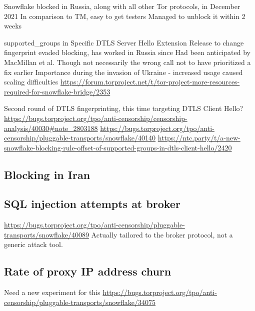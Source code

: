 \documentclass[letterpaper,twocolumn]{article}
\begin{document}
Snowflake blocked in Russia, along with all other Tor protocols,
in December 2021 \cite{ooni-2021-russia-blocks-tor}
In comparison to TM, easy to get testers
Managed to unblock it within 2 weeks

supported\_groups in Specific DTLS Server Hello Extension
Release to change fingerprint evaded blocking, has worked in Russia since
Had been anticipated by MacMillan et al.\cite[\S 3]{arxiv.2008.03254}
Though not necessarily the wrong call not to have prioritized a fix earlier
Importance during the invasion of Ukraine
- increased usage caused scaling difficulties
  \url{https://forum.torproject.net/t/tor-project-more-resources-required-for-snowflake-bridge/2353}

Second round of DTLS fingerprinting, this time targeting DTLS Client Hello?
\url{https://bugs.torproject.org/tpo/anti-censorship/censorship-analysis/40030#note_2803188}
\url{https://bugs.torproject.org/tpo/anti-censorship/pluggable-transports/snowflake/40140}
\url{https://ntc.party/t/a-new-snowflake-blocking-rule-offset-of-supported-groups-in-dtls-client-hello/2420}

\subsection{Blocking in Iran}
\label{sec:block-ir}


\subsection{SQL injection attempts at broker}



\url{https://bugs.torproject.org/tpo/anti-censorship/pluggable-transports/snowflake/40089}
Actually tailored to the broker protocol, not a generic attack tool.

\subsection{Rate of proxy IP address churn}
\label{sec:proxy-churn}


Need a new experiment for this
\url{https://bugs.torproject.org/tpo/anti-censorship/pluggable-transports/snowflake/34075}
\end{document}
